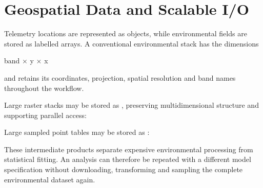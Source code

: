 \documentclass[letterpaper,10pt,english]{sphinxmanual}
\begin{document}
\section{Geospatial Data and Scalable I/O}
\label{\detokenize{implementation:geospatial-data-and-scalable-i-o}}
\sphinxAtStartPar
Telemetry locations are represented as  objects, while environmental fields are stored as labelled  arrays. A conventional environmental stack has the dimensions

\begin{sphinxVerbatim}[commandchars=\\\{\}]
band × y × x
\end{sphinxVerbatim}

\sphinxAtStartPar
and retains its coordinates, projection, spatial resolution and band names throughout the workflow.

\sphinxAtStartPar
Large raster stacks may be stored as , preserving multidimensional structure and supporting parallel access:

\begin{sphinxVerbatim}[commandchars=\\\{\}]
 

\end{sphinxVerbatim}

\sphinxAtStartPar
Large sampled point tables may be stored as :

\begin{sphinxVerbatim}[commandchars=\\\{\}]
 

 
\end{sphinxVerbatim}

\sphinxAtStartPar
These intermediate products separate expensive environmental processing from statistical fitting. An analysis can therefore be repeated with a different model specification without downloading, transforming and sampling the complete environmental dataset again.
\end{document}
